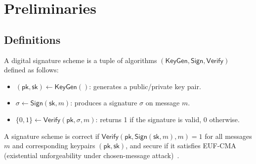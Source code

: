 \section{Preliminaries}\label{sec:prelims}

\subsection{Definitions} 



\begin{definition}
A digital signature scheme is a tuple of algorithms $(\mathsf{KeyGen}, \mathsf{Sign}, \mathsf{Verify})$ defined as follows:
\begin{itemize}
    \item $(\mathsf{pk}, \mathsf{sk}) \leftarrow \mathsf{KeyGen}()$: generates a public/private key pair.
    \item $\sigma \leftarrow \mathsf{Sign}(\mathsf{sk}, m)$: produces a signature $\sigma$ on message $m$.
    \item $\{0, 1\} \leftarrow \mathsf{Verify}(\mathsf{pk}, \sigma, m)$: returns 1 if the signature is valid, 0 otherwise.
\end{itemize}
A signature scheme is correct if $\mathsf{Verify}(\mathsf{pk}, \mathsf{Sign}(\mathsf{sk}, m), m) = 1$ for all messages $m$ and corresponding keypairs $(\mathsf{pk}, \mathsf{sk})$, and secure if it satisfies EUF-CMA (existential unforgeability under chosen-message attack)~\cite{MenVanVan96}.
\end{definition}

